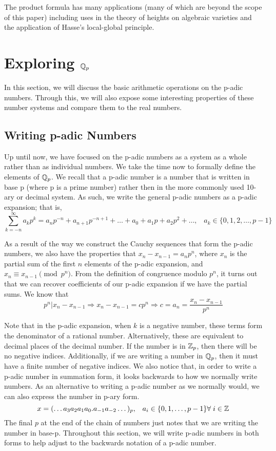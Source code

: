 \documentclass[a4paper]{article}
\begin{document}
The product formula has many applications (many of which are
beyond the scope of this paper) including uses in the theory of
heights on algebraic varieties and the application of Hasse's
local-global principle.

\section{Exploring $\mathbb Q_p$}

In this section, we will discuss the basic arithmetic operations
on the p-adic numbers.  Through this, we will also expose some
interesting properties of these number systems and compare them to
the real numbers.

\subsection{Writing p-adic Numbers}

Up until now, we have focused on the p-adic numbers as a system as a
whole rather than as individual numbers. We take the time now to
formally define the elements of $\mathbb Q_p$.  We recall that a 
p-adic number is a number that is written in base p (where p is a
prime number) rather then in the more commonly used 10-ary or decimal
system.  As such, we write the general p-adic numbers as a p-adic expansion;
that is,
\[
	\sum_{k=-n}^\infty a_kp^k=
    a_np^{-n}+a_{n+1}p^{-n+1}+\dots+a_0+a_1p+a_2p^2+\dots,\;\;\;
    a_k\in\{0,1,2,\dots,p-1\}
\]

As a result of the way we construct the Cauchy sequences that form the 
p-adic numbers, we also have the properties that $x_n-x_{n-1}=a_np^n$,
where $x_n$ is the partial sum of the first $n$ elements of the p-adic
expansion, and $x_n\equiv x_{n-1}\pmod {p^n}$.  From the definition of
congruence modulo $p^{n}$, it turns out that we can recover coefficients 
of our p-adic expansion if we have the partial sums.  We know that 
\[
  p^{n}|x_n-x_{n-1}\Rightarrow x_n-x_{n-1}=cp^n\Rightarrow
  c=a_n=\frac{x_n-x_{n-1}}{p^{n}}
\]

Note that in the p-adic expansion, when $k$ is a negative number, 
these terms form the denominator of a rational number.  Alternatively, 
these are equivalent to decimal places of the decimal number.  If
the number is in $\mathbb Z_p$, then there will be no negative indices.  
Additionally, if we are writing a number in $\mathbb Q_p$, then it must have
a finite number of negative indices.  We also notice that, in order to 
write a p-adic number in summation form, it looks backwards to how we 
normally write numbers.  As an alternative to writing a p-adic number as we
normally would, we can also express the number in p-ary form.
\[
	x=(\dots a_3a_2a_1a_0.a_{-1}a_{-2}\dots)_p,\;\;\;
    a_i\in\{0,1,\dots,p-1\}\forall\;i\in\mathbb Z
\]
The final $p$ at the end of the chain of numbers just notes that we
are writing the number in base-p.  Throughout this section, we will
write p-adic numbers in both forms to help adjust to the backwards
notation of a p-adic number.
\end{document}
